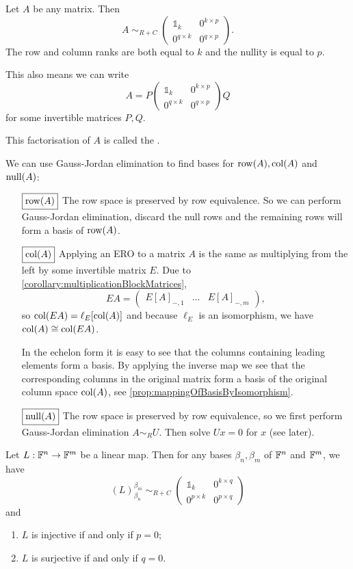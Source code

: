 \begin{corollary}
Let $A$ be any matrix. Then
\[ A \;\sim_{R+C}\; \begin{pmatrix}
\mathbb{1}_k & 0^{k\times p} \\
0^{q\times k} & 0^{q\times p}
\end{pmatrix}. \]
The row and column ranks are both equal to $k$ and the nullity is equal to $p$.

This also means we can write
\[ A = P\begin{pmatrix}
\mathbb{1}_k & 0^{k\times p} \\
0^{q\times k} & 0^{q\times p}
\end{pmatrix}Q \]
for some invertible matrices $P,Q$.
\end{corollary}
This factorisation of $A$ is called the .


We can use Gauss-Jordan elimination to find bases for $\operatorname{row}(A), \operatorname{col}(A)$ and $\operatorname{null}(A)$:
\begin{itemize}
\item[$\boxed{\operatorname{row}(A)}$] The row space is preserved by row equivalence. So we can perform Gauss-Jordan elimination, discard the null rows and the remaining rows will form a basis of $\operatorname{row}(A)$.
\item[$\boxed{\operatorname{col}(A)}$] Applying an ERO to a matrix $A$ is the same as multiplying from the left by some invertible matrix $E$. Due to \ref{corollary:multiplicationBlockMatrices},
\[ EA = \begin{pmatrix}
E[A]_{-,1} & \hdots & E[A]_{-,m}
\end{pmatrix}, \]
so $\operatorname{col}(EA) = \ell_E[\operatorname{col}(A)]$ and because $\ell_E$ is an isomorphism, we have $\operatorname{col}(A) \cong \operatorname{col}(EA)$.

In the echelon form it is easy to see that the columns containing leading elements form a basis. By applying the inverse map we see that the corresponding columns in the original matrix form a basis of the original column space $\operatorname{col}(A)$, see \ref{prop:mappingOfBasisByIsomorphism}.
\item[$\boxed{\operatorname{null}(A)}$] The row space is preserved by row equivalence, so we first perform Gauss-Jordan elimination $A\sim_R U$. Then solve $Ux=0$ for $x$ (see later).
\end{itemize}

\begin{proposition}
Let $L:\mathbb{F}^n\to\mathbb{F}^m$ be a linear map. Then for any bases $\beta_n,\beta_m$ of $\mathbb{F}^n$ and $\mathbb{F}^m$, we have
\[ (L)_{\beta_n}^{\beta_m} \;\sim_{R+C}\; \begin{pmatrix}
\mathbb{1}_k & 0^{k\times q} \\
0^{p\times k} & 0^{p\times q}
\end{pmatrix} \]
and
\begin{enumerate}
\item $L$ is injective \textup{if and only if} $p=0$;
\item $L$ is surjective \textup{if and only if} $q=0$.
\end{enumerate}
\end{proposition}


